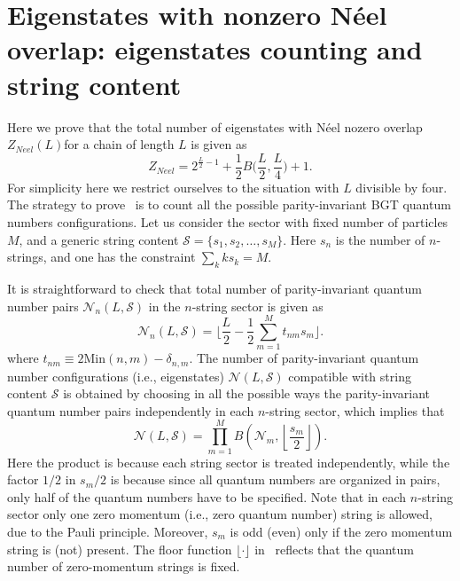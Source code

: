 \documentclass[11pt]{iopart}
\begin{document}
\appendix

\section{Eigenstates with nonzero N\'eel overlap: eigenstates counting and 
string content}
\label{app-1}

Here we prove that the total number of eigenstates with N\'eel nozero overlap 
$Z_{Neel}(L)$for a chain of length $L$ is given as 
%
\begin{equation}
\label{N-count}
Z_{Neel}=2^{\frac{L}{2}-1}+\frac{1}{2}B\Big(\frac{L}{2},\frac{L}{4}\Big)+1. 
\end{equation}
%
For simplicity here we restrict ourselves to the situation with $L$ divisible by 
four. The strategy to prove~ is to count all the possible parity-invariant 
BGT quantum numbers configurations. Let us consider the sector with fixed number of 
particles $M$, and a generic string content ${\mathcal S}=\{s_1,s_2,\dots,s_{M}\}$. 
Here $s_n$ is the number of $n$-strings, and one has the constraint $\sum_k ks_k=M$. 

It is straightforward to check that total number of parity-invariant quantum number 
pairs ${\mathcal N}_n(L,{\mathcal S})$ in the $n$-string sector is given as 
%
\begin{equation}
\label{NnLS}
{\mathcal N}_n(L,{\mathcal S})=\Big\lfloor\frac{L}{2}-\frac{1}{2}
\sum_{m=1}^{M}t_{nm}s_m\Big\rfloor.
\end{equation}
%
where $t_{nm}\equiv 2\textrm{Min}(n,m)-\delta_{n,m}$. The number of parity-invariant 
quantum number configurations (i.e., eigenstates) ${\mathcal N}(L,{\mathcal S})$ 
compatible with string content ${\mathcal S}$ is obtained by choosing in all the 
possible ways the parity-invariant quantum number pairs independently in each 
$n$-string sector, which implies that    
%
\begin{equation}
\label{NLS}
{\mathcal N}(L,{\mathcal S})=\prod_{m=1}^{M} B\left({\mathcal N}_m,\left\lfloor
\frac{s_m}{2}\right\rfloor\right).
\end{equation}
%
Here the product is because each string sector is treated independently, while the 
factor $1/2$ in $s_m/2$ is because since all quantum numbers are organized in pairs, 
only half of the quantum numbers have to be specified. Note that in each $n$-string 
sector only one zero momentum (i.e., zero quantum number) string is allowed, due to 
the Pauli principle. Moreover, $s_m$ is odd (even) only if the zero momentum string 
is (not) present. The floor function $\lfloor\cdot\rfloor$ in~ reflects 
that the quantum number of zero-momentum strings is fixed. 
\end{document}

